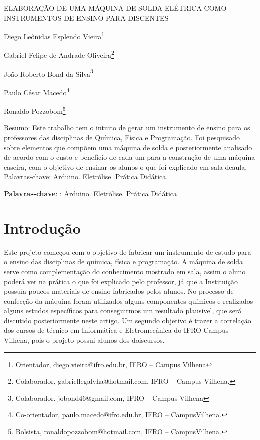 \documentclass[article,12pt,onesidea,4paper,english,brazil]{abntex2}
\begin{document}
	
	
	\frenchspacing 
	
	\begin{center}
		\LARGE ELABORAÇÃO DE UMA MÁQUINA DE SOLDA ELÉTRICA COMO
		INSTRUMENTOS DE ENSINO PARA DISCENTES
		
		\normalsize
		Diego Leônidas Esplendo Vieira\footnote{
			Orientador, diego.vieira@ifro.edu.br, IFRO – Campus Vilhena}
		 
	Gabriel Felipe
	de Andrade Oliveira\footnote{Colaborador, gabriellegalvha@hotmail.com, IFRO – Campus Vilhena.}
	 
	João Roberto
	Bond da Silva\footnote{Colaborador, jobond46@gmail.com, IFRO – Campus Vilhena}
		 
	Paulo César Macedo\footnote{Co-orientador, paulo.macedo@ifro.edu.br, IFRO – CampusVilhena.}
	
	Ronaldo Pozzobom\footnote{
		Bolsista, ronaldopozzobom@hotmail.com, IFRO – CampusVilhena.}
	
		 
		
	\end{center}


	
	\begin{resumoumacoluna}
	Resumo: Este trabalho tem o intuito de gerar um instrumento de ensino para os
	professores das disciplinas de Química, Física e Programação. Foi pesquisado
	sobre elementos que compõem uma máquina de solda e posteriormente analisado
	de acordo com o custo e benefício de cada um para a construção de uma máquina
	caseira, com o objetivo de ensinar os alunos o que foi explicado em sala deaula.
	Palavras-chave: Arduino. Eletrólise. Prática Didática.
		
		\vspace{\onelineskip}
		
		\noindent
		\textbf{Palavras-chave}: : Arduino. Eletrólise. Prática Didática
	\end{resumoumacoluna}
	
	\textual
	
	\section*{Introdução}
	
	Este projeto começou com o objetivo de fabricar um instrumento de estudo
	para o ensino das disciplinas de química, física e programação. A máquina de solda
	serve como complementação do conhecimento mostrado em sala, assim o aluno
	poderá ver na prática o que foi explicado pelo professor, já que a Instituição possuía
	poucos materiais de ensino fabricados pelos alunos. No processo de confecção da
	máquina foram utilizados alguns componentes químicos e realizados alguns estudos
	específicos para conseguirmos um resultado plausível, que será discutido
	posteriormente neste artigo. Um segundo objetivo é trazer a correlação dos cursos
	de técnico em Informática e Eletromecânica do IFRO Campus Vilhena, pois o projeto
	possui alunos dos doiscursos.
	
\end{document}
